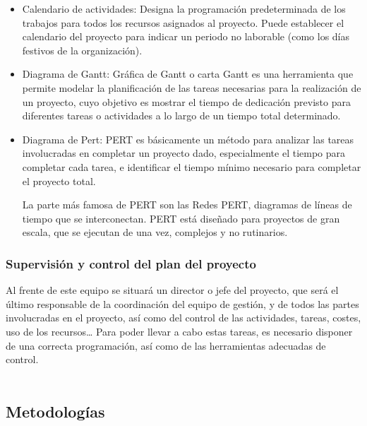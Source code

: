 \documentclass[12pt,twoside]{article}
\begin{document}
\begin{itemize}
    \item Calendario de actividades: Designa la programación predeterminada de los 
    trabajos para todos los recursos asignados al proyecto. Puede establecer el 
    calendario del proyecto para indicar un periodo no laborable (como los días 
    festivos de la organización).
    \item Diagrama de Gantt: Gráfica de Gantt o carta Gantt es una herramienta que 
    permite modelar la planificación de las tareas necesarias para la realización de 
    un proyecto, cuyo objetivo es mostrar el tiempo de dedicación previsto para 
    diferentes tareas o actividades a lo largo de un tiempo total determinado. 
    \item Diagrama de Pert: PERT es básicamente un método para analizar las tareas 
    involucradas en completar un proyecto dado, especialmente el tiempo para completar 
    cada tarea, e identificar el tiempo mínimo necesario para completar el proyecto 
    total.
    
    La parte más famosa de PERT son las Redes PERT, diagramas de líneas de tiempo que 
    se interconectan. PERT está diseñado para proyectos de gran escala, que se 
    ejecutan de una vez, complejos y no rutinarios.
\end{itemize} 

\subsubsection{Supervisión y control del plan del proyecto}
Al frente de este equipo se situará un director o jefe del proyecto, que será el 
último responsable de la coordinación del equipo de gestión, y de todos las 
partes involucradas en el proyecto, así como del control de las actividades, tareas, 
costes, uso de los recursos… Para poder llevar a cabo estas tareas, es necesario
disponer de una correcta programación, así como de las herramientas adecuadas de 
control.\\ \\
\subsection{Metodolog\'ias}
\end{document}
